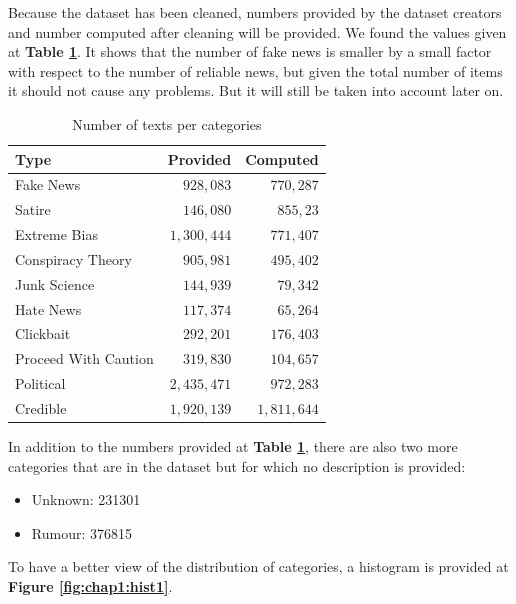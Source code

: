 Because the dataset has been cleaned, numbers provided by the dataset creators and number computed after cleaning will be provided. We found the values given at \textbf{Table \ref{tab:explo:count1}}. It shows that the number of fake news is smaller by a small factor with respect to the number of reliable news, but given the total number of items it should not cause any problems. But it will still be taken into account later on. \\

\begin{table}[h]
\centering
 \begin{tabular}{l|r|r}
  Type & Provided & Computed\\
  \hline
  Fake News & $928,083$ & $770,287$\\
  Satire & $146,080$ & $855,23$\\
  Extreme Bias & $1,300,444$ & $771,407$\\
  Conspiracy Theory & $905,981$ & $495,402$\\
  Junk Science & $144,939$ & $79,342$\\
  Hate News & $117,374$ & $65,264$\\
  Clickbait & $292,201$ & $176,403$\\
  Proceed With Caution & $319,830$ & $104,657$\\
  Political & $2,435,471$ & $972,283$\\
  Credible & $1,920,139$ & $1,811,644$\\
  \hline
\end{tabular}
  \caption{Number of texts per categories}
  \label{tab:explo:count1}
\end{table}
In addition to the numbers provided at \textbf{Table \ref{tab:explo:count1}}, there are also two more categories that are in the dataset but for which no description is provided: 
\begin{itemize}
  \item Unknown: 231301
  \item Rumour: 376815
\end{itemize}
 To have a better view of the distribution of categories, a histogram is provided at \textbf{Figure \ref{fig:chap1:hist1}}.\\

